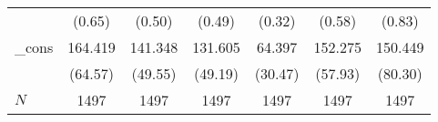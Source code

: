 {\begin{tabular}{l*{6}{c}}
            &                   (0.65)         &                   (0.50)         &                   (0.49)         &                   (0.32)         &                   (0.58)         &                   (0.83)         \\
\_cons      &                  164.419\sym{*}  &                  141.348\sym{**} &                  131.605\sym{**} &                   64.397\sym{*}  &                  152.275\sym{**} &                  150.449         \\
            &                  (64.57)         &                  (49.55)         &                  (49.19)         &                  (30.47)         &                  (57.93)         &                  (80.30)         \\
\hline
\(N\)       &                     1497         &                     1497         &                     1497         &                     1497         &                     1497         &                     1497         \\
\hline\hline
\end{tabular}
}

